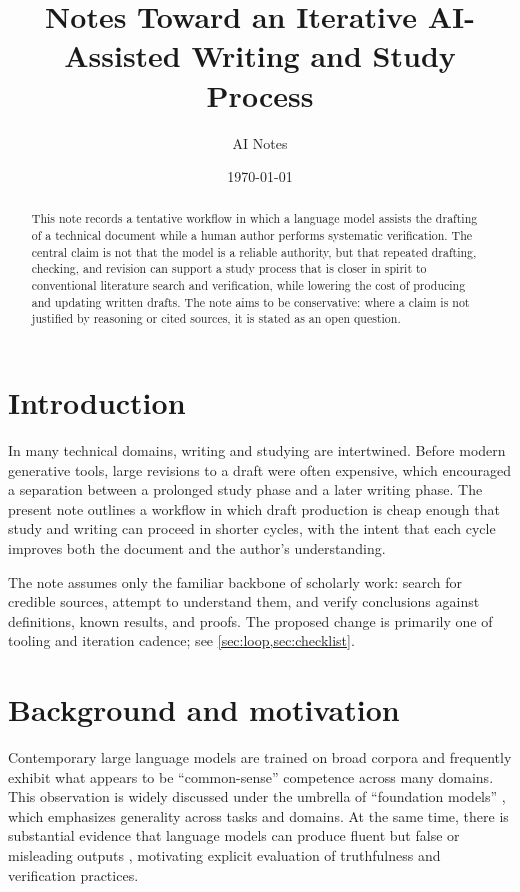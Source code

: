 \documentclass[11pt,a4paper]{article}
\title{Notes Toward an Iterative AI-Assisted Writing and Study Process}
\author{AI Notes}
\date{\today}
\theoremstyle{definition}
\theoremstyle{remark}
\begin{document}
\maketitle

\begin{abstract}
This note records a tentative workflow in which a language model assists the drafting of a technical document while a human author performs systematic verification. The central claim is not that the model is a reliable authority, but that repeated drafting, checking, and revision can support a study process that is closer in spirit to conventional literature search and verification, while lowering the cost of producing and updating written drafts. The note aims to be conservative: where a claim is not justified by reasoning or cited sources, it is stated as an open question.
\end{abstract}

\section{Introduction}
\label{sec:introduction}

In many technical domains, writing and studying are intertwined. Before modern generative tools, large revisions to a draft were often expensive, which encouraged a separation between a prolonged study phase and a later writing phase. The present note outlines a workflow in which draft production is cheap enough that study and writing can proceed in shorter cycles, with the intent that each cycle improves both the document and the author’s understanding.

The note assumes only the familiar backbone of scholarly work: search for credible sources, attempt to understand them, and verify conclusions against definitions, known results, and proofs. The proposed change is primarily one of tooling and iteration cadence; see \cref{sec:loop,sec:checklist}.

\section{Background and motivation}
\label{sec:background}

Contemporary large language models are trained on broad corpora and frequently exhibit what appears to be ``common-sense'' competence across many domains. This observation is widely discussed under the umbrella of ``foundation models'' \cite[Section~1]{Bommasani2021}, which emphasizes generality across tasks and domains. At the same time, there is substantial evidence that language models can produce fluent but false or misleading outputs \cite[Section~1]{Lin2021TruthfulQA}, motivating explicit evaluation of truthfulness and verification practices.
\end{document}
